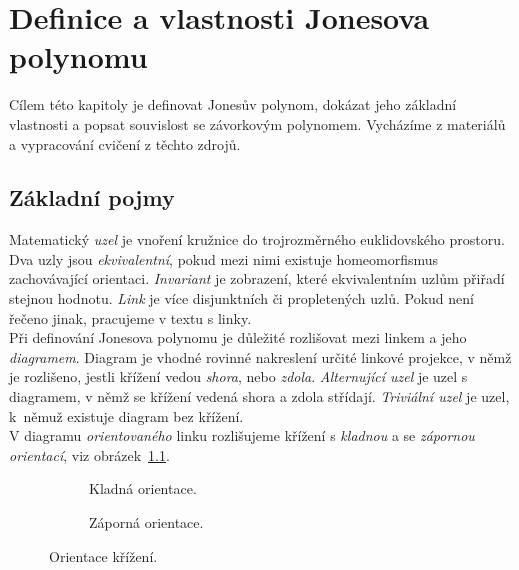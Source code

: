 
\chapter{Definice a vlastnosti Jonesova polynomu}
Cílem této kapitoly je definovat Jonesův polynom, dokázat jeho základní vlastnosti a popsat souvislost se závorkovým polynomem. Vycházíme z materiálů~\cite{cromwell2004knots, Adams2004, jones2005, weiping2016lecture} a vypracování cvičení z těchto zdrojů.
\section{Základní pojmy}
Matematický \emph{uzel} je vnoření kružnice do trojrozměrného euklidovského prostoru. Dva uzly jsou \emph{ekvivalentní}, pokud mezi nimi existuje homeomorfismus zachovávající orientaci. \emph{Invariant} je zobrazení, které ekvivalentním uzlům přiřadí stejnou hodnotu.
\emph{Link} je více disjunktních či propletených uzlů. Pokud není řečeno jinak, pracujeme v textu s linky. 
\\
Při definování Jonesova polynomu je důležité rozlišovat mezi linkem a jeho \emph{diagramem}. Diagram je vhodné rovinné nakreslení určité linkové projekce, v němž je rozlišeno, jestli křížení vedou \emph{shora}, nebo \emph{zdola}. \emph{Alternující uzel} je uzel s diagramem, v němž se křížení vedená shora a zdola střídají. \emph{Triviální uzel} je uzel, k~němuž existuje diagram bez křížení.
\\
V diagramu \emph{orientovaného} linku rozlišujeme křížení s \emph{kladnou} a se \emph{zápornou orientací}, viz obrázek~\ref{orientace}.

\begin{figure}[h]    

\centering 
\begin{subfigure}[t]{0.4\linewidth}\centering
{} 
\caption{Kladná orientace.} 
\end{subfigure}
\begin{subfigure}[t]{0.4\linewidth}\centering
{}  
\caption{Záporná orientace.}
\end{subfigure}

\caption{Orientace křížení.}
\label{orientace}
\end{figure}  


